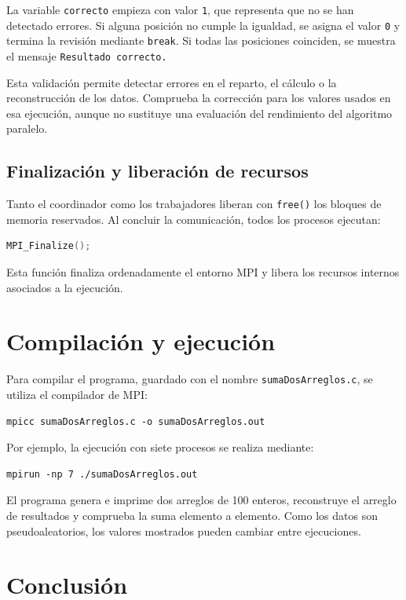 \documentclass[12pt,a4paper]{article}
\begin{document}
La variable \texttt{correcto} empieza con valor \texttt{1}, que representa
que no se han detectado errores. Si alguna posición no cumple la igualdad,
se asigna el valor \texttt{0} y termina la revisión mediante \texttt{break}.
Si todas las posiciones coinciden, se muestra el mensaje
\texttt{Resultado correcto.}

Esta validación permite detectar errores en el reparto, el cálculo o la
reconstrucción de los datos. Comprueba la corrección para los valores usados
en esa ejecución, aunque no sustituye una evaluación del rendimiento del
algoritmo paralelo.

\subsection{Finalización y liberación de recursos}

Tanto el coordinador como los trabajadores liberan con \texttt{free()} los
bloques de memoria reservados. Al concluir la comunicación, todos los
procesos ejecutan:

\begin{lstlisting}[language=C]
MPI_Finalize();
\end{lstlisting}

Esta función finaliza ordenadamente el entorno MPI y libera los recursos
internos asociados a la ejecución.

\section{Compilación y ejecución}

Para compilar el programa, guardado con el nombre
\texttt{sumaDosArreglos.c}, se utiliza el compilador de MPI:

\begin{lstlisting}
mpicc sumaDosArreglos.c -o sumaDosArreglos.out
\end{lstlisting}

Por ejemplo, la ejecución con siete procesos se realiza mediante:

\begin{lstlisting}
mpirun -np 7 ./sumaDosArreglos.out
\end{lstlisting}

El programa genera e imprime dos arreglos de 100 enteros, reconstruye el
arreglo de resultados y comprueba la suma elemento a elemento. Como los datos
son pseudoaleatorios, los valores mostrados pueden cambiar entre ejecuciones.

\section{Conclusión}
\end{document}
